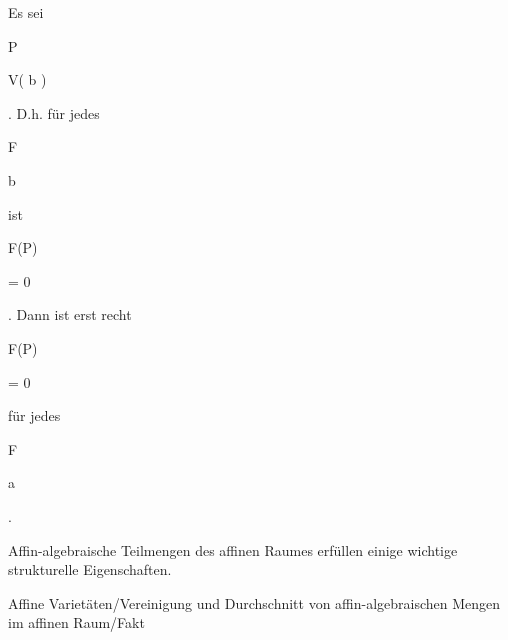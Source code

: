 {


Es sei


\mavergleichskette


{\vergleichskette


{ P
}


{ \in }{ V( {\mathfrak b} )
}


{  }{
}


{    }{
}


{   }{
}


}
{}{}{.}
D.h. für jedes


\mavergleichskette


{\vergleichskette


{ F
}


{ \in }{ {\mathfrak b}
}


{  }{
}


{    }{
}


{   }{
}


}
{}{}{}
ist


\mavergleichskette


{\vergleichskette


{ F(P)
}


{ = }{ 0
}


{  }{
}


{    }{
}


{   }{
}


}
{}{}{.}
Dann ist erst recht


\mavergleichskette


{\vergleichskette


{ F(P)
}


{ = }{ 0
}


{  }{
}


{    }{}


{   }{}


}
{}{}{}
für jedes


\mavergleichskette


{\vergleichskette


{ F
}


{ \in }{ {\mathfrak a}
}


{  }{
}


{    }{
}


{   }{
}


}
{}{}{.}


}


Affin-algebraische Teilmengen des affinen Raumes erfüllen einige wichtige strukturelle Eigenschaften.




{Affine Varietäten/Vereinigung und Durchschnitt von affin-algebraischen Mengen im affinen Raum/Fakt}


